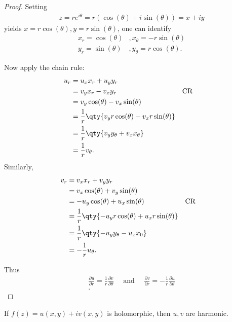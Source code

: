 \begin{proof}

Setting
\begin{align*}
z = re^{i\theta} = r(\cos(\theta) + i\sin(\theta) ) = x+iy
\end{align*}
yields \(x=r\cos(\theta), y=r\sin(\theta)\), one can identify
\begin{align*}
x_r = \cos(\theta)&, x_\theta = -r\sin(\theta) \\
y_r = \sin(\theta)&, y_\theta = r\cos(\theta)
.\end{align*}

Now apply the chain rule:
\begin{align*}
u_r 
&= u_x x_r + u_y y_r \\
&= v_y x_r -v_x y_r && \text{CR}\\
&= v_y \cos(\theta) - v_x \sin(\theta) \\
&= {1\over r}\qty{ v_y r\cos(\theta) - v_x r\sin(\theta) } \\
&= {1\over r}\qty { v_y y_\theta + v_x x_\theta} \\
&= {1\over r} v_\theta
.\end{align*}
Similarly,
\begin{align*}
v_r
&= v_x x_r + v_y y_r \\
&= v_x \cos(\theta) + v_y\sin(\theta) \\
&= -u_y\cos(\theta) + u_x\sin(\theta) && \text{CR} \\
&= {1\over r}\qty{ -u_y r\cos(\theta) + u_x r\sin(\theta)} \\
&= {1\over r}\qty{ -u_y y_\theta - u_x x_0 } \\
&= -{1\over r} u_\theta
.\end{align*}

Thus
\begin{align*}
\frac{\partial u}{\partial r}=\frac{1}{r} \frac{\partial v}{\partial \theta} \quad \text { and } \quad \frac{\partial v}{\partial r}=-\frac{1}{r} \frac{\partial u}{\partial \theta} \\
.\end{align*}

\end{proof}

\begin{proposition}

If \(f(z) = u(x, y) + iv(x, y)\) is holomorphic, then \(u, v\) are
harmonic.

\end{proposition}

